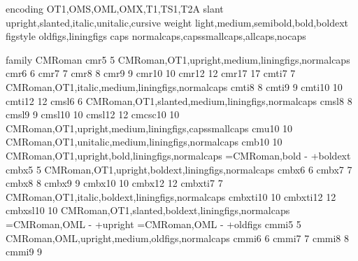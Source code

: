 

\newfontattrs encoding  OT1,OMS,OML,OMX,T1,TS1,T2A
\newfontattrs slant     upright,slanted,italic,unitalic,cursive
\newfontattrs weight    light,medium,semibold,bold,boldext
\newfontattrs figstyle  oldfigs,liningfigs
\newfontattrs caps      normalcaps,capssmallcaps,allcaps,nocaps

%
%
%
%
%
%


%
%
\newfontattr family CMRoman
 cmr5   5  CMRoman,OT1,upright,medium,liningfigs,normalcaps
 cmr6   6  {}
 cmr7   7  {}
 cmr8   8  {}
 cmr9   9  {}
 cmr10  10 {}
 cmr12  12 {}
 cmr17  17 {}
 cmti7  7  CMRoman,OT1,italic,medium,liningfigs,normalcaps
 cmti8  8  {}
 cmti9  9  {}
 cmti10 10 {}
 cmti12 12 {}
 cmsl6  6  CMRoman,OT1,slanted,medium,liningfigs,normalcaps %
 cmsl8  8  {}
 cmsl9  9  {}
 cmsl10 10 {}
 cmsl12 12 {}
 cmcsc10 10 CMRoman,OT1,upright,medium,liningfigs,capssmallcaps
 cmu10   10 CMRoman,OT1,unitalic,medium,liningfigs,normalcaps
%
 cmb10  10 CMRoman,OT1,upright,bold,liningfigs,normalcaps
\fontsubstpost =CMRoman,bold - +boldext
%
 cmbx5  5  CMRoman,OT1,upright,boldext,liningfigs,normalcaps
 cmbx6  6  {}
 cmbx7  7  {}
 cmbx8  8  {}
 cmbx9  9  {}
 cmbx10 10 {}
 cmbx12 12 {}
 cmbxti7  7  CMRoman,OT1,italic,boldext,liningfigs,normalcaps  %
 cmbxti10 10 {}
 cmbxti12 12 {} %
 cmbxsl10 10 CMRoman,OT1,slanted,boldext,liningfigs,normalcaps
%
\fontsubstpost =CMRoman,OML - +upright
\fontsubstpost =CMRoman,OML - +oldfigs
 cmmi5  5  CMRoman,OML,upright,medium,oldfigs,normalcaps
 cmmi6  6  {}
 cmmi7  7  {}
 cmmi8  8  {}
 cmmi9  9  {}
